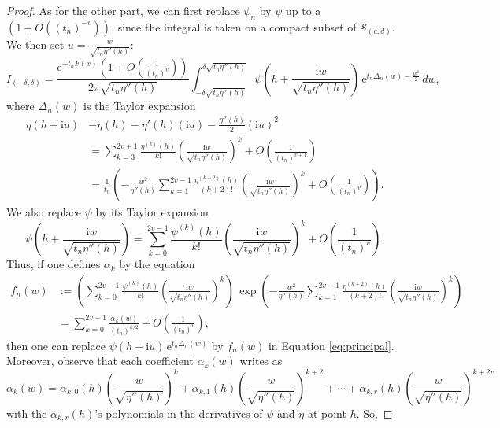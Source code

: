 \documentclass[12pt,a4paper,reqno]{amsart}
\theoremstyle{remark}
\newcommand{\E}{\mathrm{e}}
\newcommand{\I}{\mathrm{i}}
\begin{document}
\begin{proof}
As for the other part, we can first replace $\psi_{n}$ by $\psi$ up to a $(1+O((t_{n})^{-v}))$, since the integral is taken on a compact subset of $\mathcal{S}_{(c,d)}$.
We then set $u=\frac{w}{\sqrt{t_{n}\eta''(h)}}$:
\begin{equation}
I_{(-\delta,\delta)}=\frac{\E^{-t_{n}F(x)}\left(1+O\!\left(\frac{1}{(t_{n})^{v}}\right)\right)}{2\pi \sqrt{t_{n}\eta''(h)}}\int_{-\delta \sqrt{t_{n}\eta''(h)}}^{\delta  \sqrt{t_{n}\eta''(h)}} \psi\!\left(h+\frac{\I w}{ \sqrt{t_{n}\eta''(h)}}\right) \,\E^{t_{n}\Delta_n(w)-\frac{w^{2}}{2}}\,dw,
\label{eq:principal}
\end{equation}
where $\Delta_n(w)$ is the Taylor expansion
\begin{align*}
\eta\left(h+\I u\right)&-\eta(h)-\eta'(h) \left(\I u \right)-\frac{\eta''(h)}{2} \left(\I u \right)^{2}\\
&=\sum_{k=3}^{2v+1} \frac{\eta^{(k)}(h)}{k!}\left(\frac{\I w}{ \sqrt{t_{n}\eta''(h)}}\right)^{\!k}+O\!\left(\frac{1}{(t_{n})^{v+1}}\right)\\
&=\frac{1}{t_{n}} \left(-\frac{w^{2}}{\eta''(h)}\sum_{k=1}^{2v-1} \frac{\eta^{(k+2)}(h)}{(k+2)!}\left(\frac{\I w}{ \sqrt{t_{n}\eta''(h)}}\right)^{\!k}+O\!\left(\frac{1}{(t_{n})^{v}}\right)\right).
\end{align*}
We also replace $\psi$ by its Taylor expansion
$$\psi\!\left(h+\frac{\I w}{ \sqrt{t_{n}\eta''(h)}}\right)=\sum_{k=0}^{2v-1} \frac{\psi^{(k)}(h)}{k!}\left(\frac{\I w}{ \sqrt{t_{n}\eta''(h)}}\right)^{\!k}+O\!\left(\frac{1}{(t_{n})^{v}}\right).$$
Thus, if one defines $\alpha_k$ by the equation
\begin{align*}
f_{n}(w)&:=\left(\sum_{k=0}^{2v-1} \frac{\psi^{(k)}(h)}{k!}\left(\frac{\I w}{ \sqrt{t_{n}\eta''(h)}}\right)^{\!k}\right)\,\exp\!\left(-\frac{w^{2}}{\eta''(h)}\sum_{k=1}^{2v-1} \frac{\eta^{(k+2)}(h)}{(k+2)!}\left(\frac{\I w}{ \sqrt{t_{n}\eta''(h)}} \right)^{\!k}\right)\\
&=\sum_{k=0}^{2v-1} \frac{\alpha_{k}(w)}{(t_{n})^{k/2}}+O\!\left(\frac{1}{(t_{n})^{v}}\right),
\end{align*}
then one can replace $\psi(h+\I u) \,\E^{t_{n}\Delta_n(w)}$ by $f_{n}(w)$ in Equation \eqref{eq:principal}. Moreover, observe that each coefficient $\alpha_{k}(w)$ writes as
$$\alpha_{k}(w)=\alpha_{k,0}(h)\left(\frac{w}{\sqrt{\eta''(h)}}\right)^{k}+\alpha_{k,1}(h)\left(\frac{w}{\sqrt{\eta''(h)}}\right)^{k+2}+\cdots+\alpha_{k,r}(h)\left(\frac{w}{\sqrt{\eta''(h)}}\right)^{k+2r}$$
with the $\alpha_{k,r}(h)$'s polynomials in the derivatives of $\psi$ and $\eta$ at point $h$. So,

\end{proof}
\end{document}
